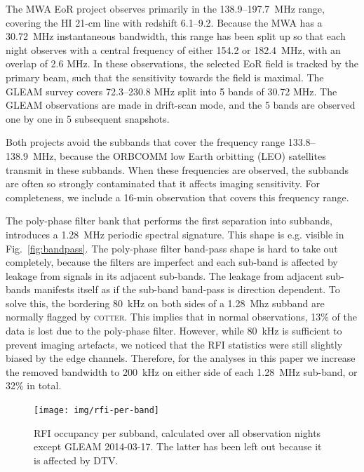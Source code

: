\documentclass{pasa}
\begin{document}
The MWA EoR project observes primarily in the 138.9--197.7~MHz range, covering the HI 21-cm line with redshift 6.1--9.2. Because the MWA has a 30.72~MHz instantaneous bandwidth, this range has been split up so that each night observes with a central frequency of either 154.2 or 182.4~MHz, with an overlap of 2.6 MHz. In these observations, the selected EoR field is tracked by the primary beam, such that the sensitivity towards the field is maximal. The GLEAM survey covers 72.3--230.8 MHz split into 5 bands of 30.72 MHz. The GLEAM observations are made in drift-scan mode, and the 5 bands are observed one by one in 5 subsequent snapshots.

Both projects avoid the subbands that cover the frequency range 133.8--138.9~MHz, because the ORBCOMM low Earth orbitting (LEO) satellites transmit in these subbands. When these frequencies are observed, the subbands are often so strongly contaminated that it affects imaging sensitivity. For completeness, we include a 16-min observation that covers this frequency range.

The poly-phase filter bank that performs the first separation into subbands, introduces a 1.28~MHz periodic spectral signature. This shape is e.g. visible in Fig.~\ref{fig:bandpass}. The poly-phase filter band-pass shape is hard to take out completely, because the filters are imperfect and each sub-band is affected by leakage from signals in its adjacent sub-bands. The leakage from adjacent sub-bands manifests itself as if the sub-band band-pass is direction dependent. To solve this, the bordering 80~kHz on both sides of a 1.28~Mhz subband are normally flagged by \textsc{cotter}. This implies that in normal observations, 13\% of the data is lost due to the poly-phase filter. However, while 80~kHz is sufficient to prevent imaging artefacts, we noticed that the RFI statistics were still slightly biased by the edge channels. Therefore, for the analyses in this paper we increase the removed bandwidth to 200~kHz on either side of each 1.28~MHz sub-band, or 32\% in total.

\noindent\begin{figure}
\begin{center}\hspace*{-0.2cm}\texttt{[image: img/rfi-per-band]}
\caption{RFI occupancy per subband, calculated over all observation nights except GLEAM 2014-03-17. The latter has been left out because it is affected by DTV.}
\label{fig:rfi-per-band}
\end{center}
\end{figure}
\end{document}

